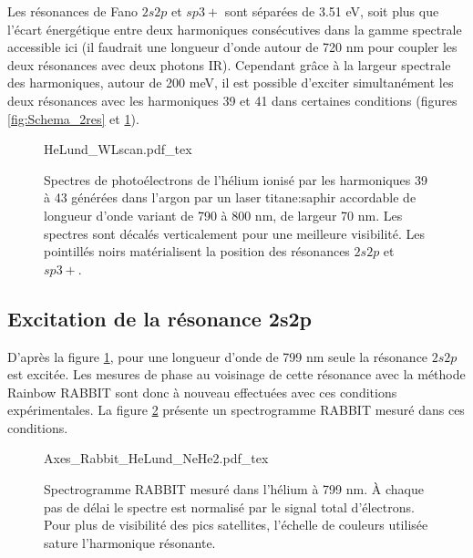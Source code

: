 Les résonances de Fano $2s2p$ et $sp3+$ sont séparées de 3.51 eV, soit plus que l'écart énergétique entre deux harmoniques consécutives dans la gamme spectrale accessible ici (il faudrait une longueur d'onde autour de 720 nm pour coupler les deux résonances avec deux photons IR). Cependant grâce à la largeur spectrale des harmoniques, autour de 200 meV, il est possible d'exciter simultanément les deux résonances avec les harmoniques 39 et 41 dans certaines conditions (figures \ref{fig:Schema_2res} et \ref{fig:HeLund_WLscan}).

\begin{figure}
\centering
\def\svgwidth{\textwidth}
{HeLund_WLscan.pdf_tex}
\caption{Spectres de photoélectrons de l'hélium ionisé par les harmoniques 39 à 43 générées dans l'argon par un laser titane:saphir accordable de longueur d'onde variant de 790 à 800 nm, de largeur 70 nm. Les spectres sont décalés verticalement pour une meilleure visibilité. Les pointillés noirs matérialisent la position des résonances $2s2p$ et $sp3+$.}
\label{fig:HeLund_WLscan}
\end{figure}

\subsection{Excitation de la résonance 2s2p}
D'après la figure \ref{fig:HeLund_WLscan}, pour une longueur d'onde de 799 nm seule la résonance $2s2p$ est excitée. Les mesures de phase au voisinage de cette résonance avec la méthode Rainbow RABBIT sont donc à nouveau effectuées avec ces conditions expérimentales. La figure \ref{fig:Rabbit_HeLund_2s2p} présente un spectrogramme RABBIT mesuré dans ces conditions.

\begin{figure}
\centering
\def\svgwidth{0.7\textwidth}
{Axes_Rabbit_HeLund_NeHe2.pdf_tex}
\caption{Spectrogramme RABBIT mesuré dans l'hélium à 799 nm. \`{A} chaque pas de délai le spectre est normalisé par le signal total d'électrons. Pour plus de visibilité des pics satellites, l'échelle de couleurs utilisée sature l'harmonique résonante.}
\label{fig:Rabbit_HeLund_2s2p}
\end{figure}


